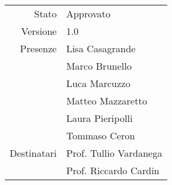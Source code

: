 \begin{center}
\begin{tabular}{r|l}
	Stato & Approvato \\
	Versione & 1.0 \\
	Presenze & Lisa Casagrande \\
	         & Marco Brunello \\
             & Luca Marcuzzo \\
	         & Matteo Mazzaretto \\
	         & Laura Pieripolli \\
	         & Tommaso Ceron \\
	Destinatari & Prof. Tullio Vardanega \\
	            & Prof. Riccardo Cardin
\end{tabular}
\end{center}